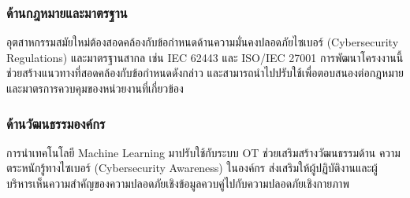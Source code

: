 \subsubsection{ด้านกฎหมายและมาตรฐาน}
    \hspace{2em} อุตสาหกรรมสมัยใหม่ต้องสอดคล้องกับข้อกำหนดด้านความมั่นคงปลอดภัยไซเบอร์ (Cybersecurity Regulations) และมาตรฐานสากล เช่น IEC 62443 และ ISO/IEC 27001 การพัฒนาโครงงานนี้ช่วยสร้างแนวทางที่สอดคล้องกับข้อกำหนดดังกล่าว และสามารถนำไปปรับใช้เพื่อตอบสนองต่อกฎหมาย \\ และมาตรการควบคุมของหน่วยงานที่เกี่ยวข้อง

\subsubsection{ด้านวัฒนธรรมองค์กร}
    \hspace{2em} การนำเทคโนโลยี Machine Learning มาปรับใช้กับระบบ OT ช่วยเสริมสร้างวัฒนธรรมด้าน ความตระหนักรู้ทางไซเบอร์ (Cybersecurity Awareness) ในองค์กร ส่งเสริมให้ผู้ปฏิบัติงานและผู้บริหารเห็นความสำคัญของความปลอดภัยเชิงข้อมูลควบคู่ไปกับความปลอดภัยเชิงกายภาพ